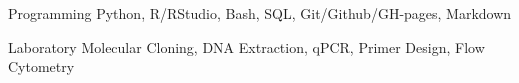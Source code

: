 

\begin{cvskills}

  \cvskill
    {Programming} %
    {Python, R/RStudio, Bash, SQL, Git/Github/GH-pages, Markdown} %

  \cvskill
    {Laboratory} %
    {Molecular Cloning, DNA Extraction, qPCR, Primer Design, Flow Cytometry} %

\end{cvskills}
